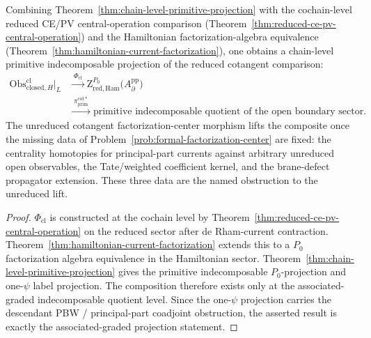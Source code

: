 \begin{cor}
  \label{cor:unreduced-d-closed}
  Combining
  Theorem~\ref{thm:chain-level-primitive-projection} with the
  cochain-level reduced CE/PV central-operation comparison
  (Theorem~\ref{thm:reduced-ce-pv-central-operation}) and the Hamiltonian
  factorization-algebra equivalence
  (Theorem~\ref{thm:hamiltonian-current-factorization}), one
	  obtains a chain-level primitive indecomposable projection of the reduced cotangent
  comparison:
  \begin{align*}
    \mathrm{Obs}^{\mathrm{cl}}_{\mathrm{closed},H}\big|_{L}
    &\xrightarrow{\;\Phi_{\mathrm{cl}}\;}
    \mathrm Z^{P_0}_{\mathrm{red,Ham}}\bigl(A_\partial^{\mathrm{pp}}\bigr) \\
    &\xrightarrow{\;\pi_{\mathrm{prim}}^{\mathrm{cot}*}\;}
    \text{primitive indecomposable quotient of the open boundary sector}.
  \end{align*}
  The unreduced cotangent factorization-center morphism lifts the
  composite once the missing data of
  Problem~\ref{prob:formal-factorization-center} are fixed: the
  centrality homotopies for principal-part currents against arbitrary
  unreduced open observables, the Tate/weighted coefficient kernel,
  and the brane-defect propagator extension.  These three data are
  the named obstruction to the unreduced lift.
\end{cor}

\begin{proof}
  $\Phi_{\mathrm{cl}}$ is constructed at the cochain level by
  Theorem~\ref{thm:reduced-ce-pv-central-operation} on the reduced sector
	  after de Rham-current contraction.  Theorem~\ref{thm:hamiltonian-current-factorization}
	  extends this to a $P_0$ factorization algebra equivalence
  in the Hamiltonian sector.
	  Theorem~\ref{thm:chain-level-primitive-projection} gives the
	  primitive indecomposable \(P_0\)-projection and one-$\psi$ label projection. The
  composition therefore exists only at the associated-graded
  indecomposable quotient level.
  Since the one-$\psi$ projection carries the descendant PBW /
  principal-part coadjoint obstruction, the asserted result is exactly
  the associated-graded projection statement.
\end{proof}

